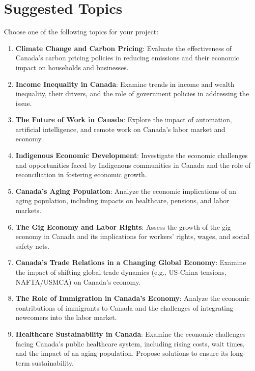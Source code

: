 \documentclass[12pt]{article}
\begin{document}
\section*{Suggested Topics}
Choose one of the following topics for your project:
\begin{enumerate}[label=\arabic*.]
    \item \textbf{Climate Change and Carbon Pricing}: Evaluate the effectiveness of Canada’s carbon pricing policies in reducing emissions and their economic impact on households and businesses.
    \item \textbf{Income Inequality in Canada}: Examine trends in income and wealth inequality, their drivers, and the role of government policies in addressing the issue.
    \item \textbf{The Future of Work in Canada}: Explore the impact of automation, artificial intelligence, and remote work on Canada’s labor market and economy.
    \item \textbf{Indigenous Economic Development}: Investigate the economic challenges and opportunities faced by Indigenous communities in Canada and the role of reconciliation in fostering economic growth.
    \item \textbf{Canada’s Aging Population}: Analyze the economic implications of an aging population, including impacts on healthcare, pensions, and labor markets.
    \item \textbf{The Gig Economy and Labor Rights}: Assess the growth of the gig economy in Canada and its implications for workers’ rights, wages, and social safety nets.
    \item \textbf{Canada’s Trade Relations in a Changing Global Economy}: Examine the impact of shifting global trade dynamics (e.g., US-China tensions, NAFTA/USMCA) on Canada’s economy.
    \item \textbf{The Role of Immigration in Canada’s Economy}: Analyze the economic contributions of immigrants to Canada and the challenges of integrating newcomers into the labor market.
    \item \textbf{Healthcare Sustainability in Canada}: Examine the economic challenges facing Canada’s public healthcare system, including rising costs, wait times, and the impact of an aging population. Propose solutions to ensure its long-term sustainability.
\end{enumerate}
\end{document}
